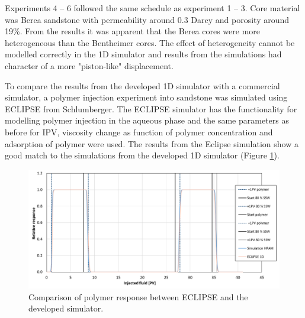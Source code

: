 \documentclass[nanomaterials,article,submit,moreauthors,pdftex]{Definitions/mdpi}
\begin{document}
Experiments 4 – 6 followed the same schedule as experiment 1 – 3. Core material was Berea sandstone with permeability around 0.3 Darcy and porosity around 19\%. From the results it was apparent that the Berea cores were more heterogeneous than the Bentheimer cores. The effect of heterogeneity cannot be modelled correctly in the 1D simulator and results from the simulations had character of a more "piston-like" displacement.

To compare the results from the developed 1D simulator with a commercial simulator, a polymer injection experiment into sandstone was simulated using ECLIPSE from Schlumberger.
The ECLIPSE simulator has the functionality for modelling polymer injection in the aqueous phase and the same parameters as before for IPV, viscosity change as function of polymer concentration and adsorption of polymer were used. The results from the Eclipse simulation show a good match to the simulations from the developed 1D simulator (Figure \ref{cht:simEcl}).

\begin{figure}[h!]
    \centering
    \includegraphics[width=.8\textwidth]{fig/simEcl.png}
    \caption{Comparison of polymer response between ECLIPSE and the developed simulator.}
    \label{cht:simEcl}
    \vspace{1cm}
\end{figure}


\end{document}
